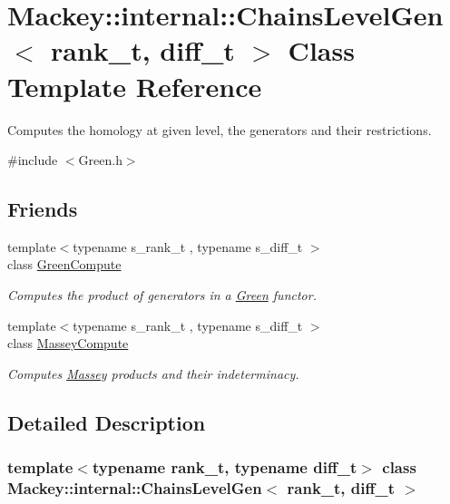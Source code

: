 \hypertarget{classMackey_1_1internal_1_1ChainsLevelGen}{}\section{Mackey\+:\+:internal\+:\+:Chains\+Level\+Gen$<$ rank\+\_\+t, diff\+\_\+t $>$ Class Template Reference}
\label{classMackey_1_1internal_1_1ChainsLevelGen}


Computes the homology at given level, the generators and their restrictions.  




{\ttfamily \#include $<$Green.\+h$>$}

\subsection*{Friends}
\begin{DoxyCompactItemize}
\item 
{\footnotesize template$<$typename s\+\_\+rank\+\_\+t , typename s\+\_\+diff\+\_\+t $>$ }\\class \hyperlink{classMackey_1_1internal_1_1ChainsLevelGen_a85de7c4aeeee34981e2020c2f9ddd3e2}{Green\+Compute}
\begin{DoxyCompactList}\small\item\em Computes the product of generators in a \hyperlink{classMackey_1_1Green}{Green} functor. \end{DoxyCompactList}\item 
{\footnotesize template$<$typename s\+\_\+rank\+\_\+t , typename s\+\_\+diff\+\_\+t $>$ }\\class \hyperlink{classMackey_1_1internal_1_1ChainsLevelGen_af259bfb9b4dced17104ac8fbb697355c}{Massey\+Compute}
\begin{DoxyCompactList}\small\item\em Computes \hyperlink{classMackey_1_1Massey}{Massey} products and their indeterminacy. \end{DoxyCompactList}\end{DoxyCompactItemize}


\subsection{Detailed Description}
\subsubsection*{template$<$typename rank\+\_\+t, typename diff\+\_\+t$>$\newline
class Mackey\+::internal\+::\+Chains\+Level\+Gen$<$ rank\+\_\+t, diff\+\_\+t $>$}

